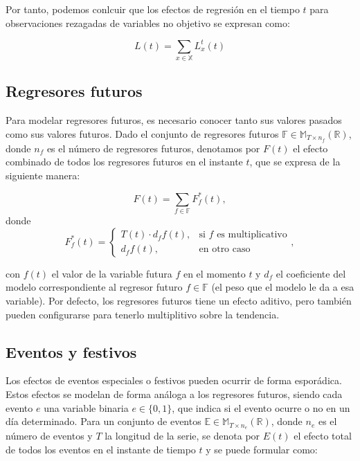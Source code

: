 \documentclass[12pt,twoside]{article}
\begin{document}
Por tanto, podemos conlcuir que los efectos de regresión en el tiempo $t$ para observaciones rezagadas de variables no objetivo se expresan como:

\begin{equation}
L(t) = \sum_{x \in \mathbb{X}}L_x^t(t)
\end{equation}

\subsection{Regresores futuros}\label{sec:29}

Para modelar regresores futuros, es necesario conocer tanto sus valores pasados como sus valores futuros. Dado el conjunto de regresores futuros $\mathbb{F}\in \mathbb{M}_{T \times n_f}(\mathbb{R})$, donde $n_f$ es el número de regresores futuros, denotamos por $F(t)$ el efecto combinado de todos los regresores futuros en el instante $t$, que se expresa de la siguiente manera:

\begin{equation}
F(t) = \sum_{f\in\mathbb{F}} F^*_f(t), 
\end{equation}
 donde 
\begin{equation}
F_f^*(t) =
\begin{cases}
T(t) \cdot d_ff(t), & \text{si } f \text{ es multiplicativo} \\
d_ff(t), & \text{en otro caso}
\end{cases},
\end{equation}

con $f(t)$ el valor de la variable futura $f$ en el momento $t$ y $d_f$ el coeficiente del modelo correspondiente al regresor futuro $f\in \mathbb{F}$ (el peso que el modelo le da a esa variable). Por defecto, los regresores futuros tiene un efecto aditivo, pero también pueden configurarse para tenerlo multiplitivo sobre la tendencia.


\subsection{Eventos y festivos}\label{sec:30}

Los efectos de eventos especiales o festivos pueden ocurrir de forma esporádica. Estos efectos se modelan de forma análoga a los regresores futuros, siendo cada evento $e$ una variable binaria $e\in\{0,1\}$, que indica si el evento ocurre o no en un día determinado. Para un conjunto de eventos $\mathbb{E} \in \mathbb{M}_{T \times n_e}(\mathbb{R})$, donde $n_e$ es el número de eventos y $T$ la longitud de la serie, se denota por $E(t)$ el efecto total de todos los eventos en el instante de tiempo $t$ y se puede formular como:
\end{document}
